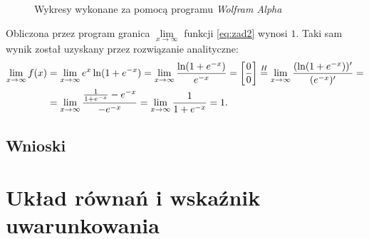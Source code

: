 \documentclass[11pt]{mk-polish-lab-report}
\let\times\relax%
\DeclareMathOperator{\times}{\cdot}
\begin{document}
\begin{figure}[h]
\centering
{}\hfill
{}\hfill
\caption{Wykresy wykonane za pomocą programu \emph{Wolfram Alpha}} \label{fig:zad2-wa}
\end{figure}
\noindent Obliczona przez program granica $\mathop {\lim }\limits_{x \to \infty}$ funkcji \eqref{eq:zad2} wynosi $1$. Taki sam wynik został uzyskany przez rozwiązanie analityczne:
\begin{equation}
\begin{aligned}
\mathop {\lim }\limits_{x \to \infty} f(x) &= \mathop {\lim }\limits_{x \to \infty} e^x \ln(1 + e^{-x}) = \mathop {\lim }\limits_{x \to \infty} \dfrac{\ln(1 + e^{-x})}{e^{-x}} = \left[\dfrac{0}{0}\right] \stackrel{H}{=} \mathop {\lim }\limits_{x \to \infty} \dfrac{(\ln(1 + e^{-x}))'}{(e^{-x})'} = \\ 
&= \mathop {\lim }\limits_{x \to \infty} \dfrac{\frac{1}{1 + e^{-x}}\times -e^{-x}}{-e^{-x}} = \mathop {\lim }\limits_{x \to \infty} \dfrac{1}{1 + e^{-x}} = 1. \nonumber
\end{aligned}
\end{equation}

\subsection{Wnioski}

\section{Układ równań i wskaźnik uwarunkowania}
\end{document}
